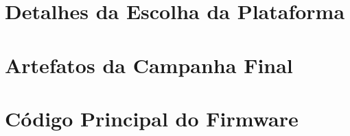 \documentclass[english,brazil]{packages/icmc}
\begin{document}
\begin{apendicesenv}

    \chapter{Detalhes da Escolha da Plataforma}
    \label{appendix:escolha-plataforma}
    

    \chapter{Artefatos da Campanha Final}
    \label{appendix:full-run}
    

    \chapter{Código Principal do Firmware}
    \label{appendix:main-cpp}
    

\end{apendicesenv}



%
%    
%
\end{document}
